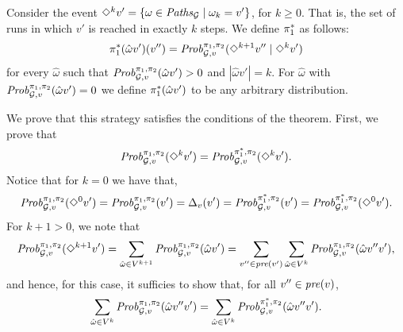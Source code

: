 \begin{myproof}
  Consider the event $\Diamond^{k} v' = \{ \omega \in
  \mathit{Paths}_{\mathcal{G}} \mid \omega_k = v'\}$, for $k\geq 0$. That is,
  the set of runs in which $v'$ is reached in exactly $k$ steps.
  We define $\pi^*_{1}$ as follows:
  \[
  \pi^*_{1}(\hat{\omega}v')(v'') =  \mathit{Prob}^{\pi_{1}, \pi_{2}}_{\mathcal{G},v}(\Diamond^{k+1} v'' \mid \Diamond^k v') 
  \]
  for every $\hat{\omega}$ such that
  $\mathit{Prob}^{\pi_{1}, \pi_{2}}_{\mathcal{G},v}(\hat{\omega}v') > 0$ and
  $|\hat{\omega}v'| = k$.  For $\hat{\omega}$ with
  $\mathit{Prob}^{\pi_{1}, \pi_{2}}_{\mathcal{G},v}(\hat{\omega}v') = 0$ we
  define $\pi^*_{1}(\hat{\omega}v')$ to be any arbitrary
  distribution.

  We prove that this strategy satisfies the conditions of the theorem.
  First, we prove that
  \begin{equation}\label{equ:diamondk}
    \mathit{Prob}^{\pi_{1}, \pi_{2}}_{\mathcal{G},v}(\Diamond^{k} v') =
    \mathit{Prob}^{\pi^*_{1}, \pi_{2}}_{\mathcal{G},v}(\Diamond^{k} v').
  \end{equation}
  Notice that for $k=0$ we have that,
  \[\mathit{Prob}^{\pi_{1}, \pi_{2}}_{\mathcal{G},v}(\Diamond^{0} v') =
  \mathit{Prob}^{\pi_{1}, \pi_{2}}_{\mathcal{G},v}(v') = \Delta_v(v') =
  \mathit{Prob}^{\pi^*_{1}, \pi_{2}}_{\mathcal{G},v}(v')=
  \mathit{Prob}^{\pi^*_{1}, \pi_{2}}_{\mathcal{G},v}(\Diamond^{0} v').\]
  For $k + 1 > 0$, we note that
  \[
  \mathit{Prob}^{\pi_{1}, \pi_{2}}_{\mathcal{G},v}(\Diamond^{k+1} v') = \sum_{\hat{\omega} \in V^{k+1}} \mathit{Prob}^{\pi_{1}, \pi_{2}}_{\mathcal{G},v}(\hat{\omega}v')  = \sum_{v'' \in \mathit{pre}(v')}\sum_{\hat{\omega} \in V^k} \mathit{Prob}^{\pi_{1}, \pi_{2}}_{\mathcal{G},v}(\hat{\omega}v''v'),
  \] 
  and hence, for this case, it sufficies to show that, for all
  $v''\in\mathit{pre}(v)$,
  \[
    \sum_{\hat{\omega} \in V^k} \mathit{Prob}^{\pi_{1}, \pi_{2}}_{\mathcal{G},v}(\hat{\omega}v''v') = \sum_{\hat{\omega} \in V^k} \mathit{Prob}^{\pi^*_{1}, \pi_{2}}_{\mathcal{G},v}(\hat{\omega}v''v').
  \]


\end{myproof}
